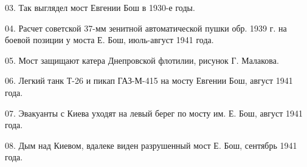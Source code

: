 03. Так выглядел мост Евгении Бош в 1930-е годы.

04. Расчет советской 37-мм зенитной автоматической пушки обр. 1939 г. на боевой
позиции у моста Е. Бош, июль-август 1941 года.

05. Мост защищают катера Днепровской флотилии, рисунок Г. Малакова.

06. Легкий танк Т-26 и пикап ГАЗ-М-415 на мосту Евгении Бош, август 1941 года.

07. Эвакуанты с Киева уходят на левый берег по мосту им. Е. Бош, август 1941
года.

08. Дым над Киевом, вдалеке виден разрушенный мост Е. Бош, сентябрь 1941 года.
